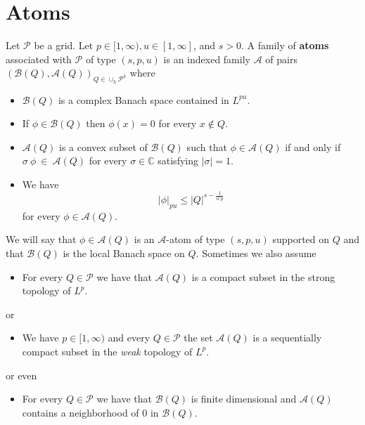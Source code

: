 \documentclass{amsart}
\theoremstyle{definition}
\newcommand{\Cll}[2][normal]{\Cl[#1]{#2}}
\newcommand{\Crr}[1]{\Cr{#1}}
\begin{document}
\section{Atoms}

 Let $\mathcal{P}$ be a grid.  Let $p \in [1,\infty), u \in [1,\infty]$,  and $s> 0$. A family of  {\bf atoms } associated with $\mathcal{P}$ of type $(s,p,u)$ is an indexed family $\mathcal{A}$ of pairs   $(\mathcal{B}(Q),\mathcal{A}(Q))_{Q\in \cup_k \mathcal{P}^k}$ where  \\
\begin{itemize}
\item[${\Cll[A]{banach}}$.] $\mathcal{B}(Q)$ is a complex Banach space contained in $L^{pu}$.
\item[${\Cll[A]{suporte}}$.] If $\phi \in \mathcal{B}(Q)$ then $\phi(x)=0$ for every $x \not\in Q$.
\item[${\Cll[A]{convex}}$.]  $\mathcal{A}(Q)$ is a convex subset of $\mathcal{B}(Q)$ such that $\phi \in \mathcal{A}(Q)$ if and only if $\sigma~\phi~\in~\mathcal{A}(Q)$ for every $\sigma \in \mathbb{C}$ satisfying $|\sigma|=1$.
\item[${\Cll[A]{atom}}$.] We have $$|\phi|_{pu} \leq |Q|^{s-\frac{1}{u'p}}$$ for every $\phi \in \mathcal{A}(Q)$. 
\end{itemize}

 We will say that $\phi \in \mathcal{A}(Q)$ is an $\mathcal{A}$-atom of type $(s,p,u)$ supported on $Q$ and that $\mathcal{B}(Q)$ is  the local Banach space on $Q$. Sometimes we also assume \\
\begin{itemize}
\item[${\Cll[A]{compact}}$.]  For every $Q\in \mathcal{P}$ we have that $\mathcal{A}(Q)$ is a compact subset in the strong topology of    $L^p$.\\
\end{itemize}
or
\begin{itemize}
\item[${\Cll[A]{compactw}}$.] We have $p\in [1,\infty)$ and  every $Q\in \mathcal{P}$ the set  $\mathcal{A}(Q)$ is a sequentially compact subset in the {\it weak } topology   of $L^p$.\\
\end{itemize}
or even \\
\begin{itemize}
\item[${\Cll[A]{finite}}$.]  For every $Q\in \mathcal{P}$ we have that $\mathcal{B}(Q)$ is finite dimensional and  $\mathcal{A}(Q)$ contains a neighborhood of $0$ in $\mathcal{B}(Q)$.\\
\end{itemize}
 
\end{document}
